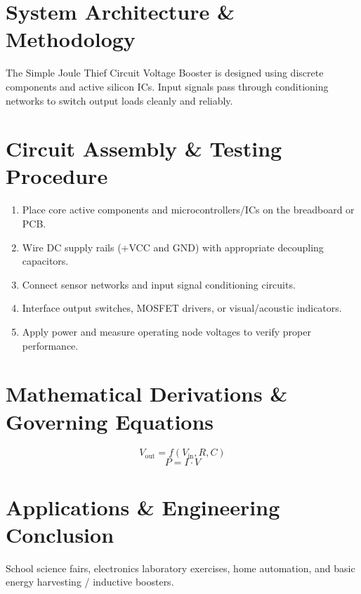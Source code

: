 \documentclass[11pt,a4paper]{article}
\begin{document}
\section{System Architecture \& Methodology}
The Simple Joule Thief Circuit Voltage Booster is designed using discrete components and active silicon ICs. Input signals pass through conditioning networks to switch output loads cleanly and reliably.

\section{Circuit Assembly \& Testing Procedure}
\begin{enumerate}
    \item Place core active components and microcontrollers/ICs on the breadboard or PCB.
    \item Wire DC supply rails (+VCC and GND) with appropriate decoupling capacitors.
    \item Connect sensor networks and input signal conditioning circuits.
    \item Interface output switches, MOSFET drivers, or visual/acoustic indicators.
    \item Apply power and measure operating node voltages to verify proper performance.
\end{enumerate}

\section{Mathematical Derivations \& Governing Equations}
\begin{equation}
V_{\text{out}} = f(V_{\text{in}}, R, C)
\end{equation}
\begin{equation}
P = I \cdot V
\end{equation}

\section{Applications \& Engineering Conclusion}
School science fairs, electronics laboratory exercises, home automation, and basic energy harvesting / inductive boosters.
\end{document}
